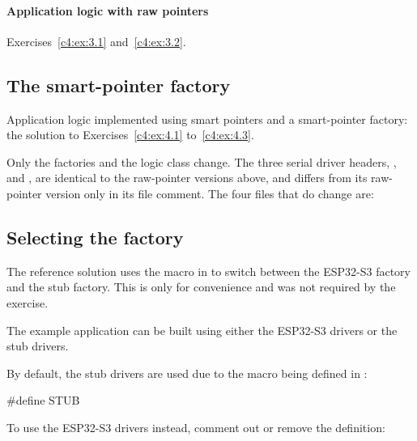\paragraph{Application logic with raw pointers}
Exercises~\ref{c4:ex:3.1} and~\ref{c4:ex:3.2}.


\subsection{The smart-pointer factory}
\label{sol:set:c4.4}
Application logic implemented using smart pointers and a smart-pointer factory: the solution to
Exercises~\ref{c4:ex:4.1} to~\ref{c4:ex:4.3}.

Only the factories and the logic class change. The three serial driver headers,
,  and
, are identical to the raw-pointer versions above, and
 differs from its raw-pointer version only in its file comment. The four files that
do change are:


\subsection{Selecting the factory}
\label{sol:c4:selecting}
The reference solution uses the  macro in  to switch between the ESP32-S3
factory and the stub factory. This is only for convenience and was not required by the exercise.

The example application can be built using either the ESP32-S3 drivers or the stub drivers.

By default, the stub drivers are used due to the macro  being defined in
:

\begin{cppcode}
#define STUB
\end{cppcode}

\noindent To use the ESP32-S3 drivers instead, comment out or remove the definition:


